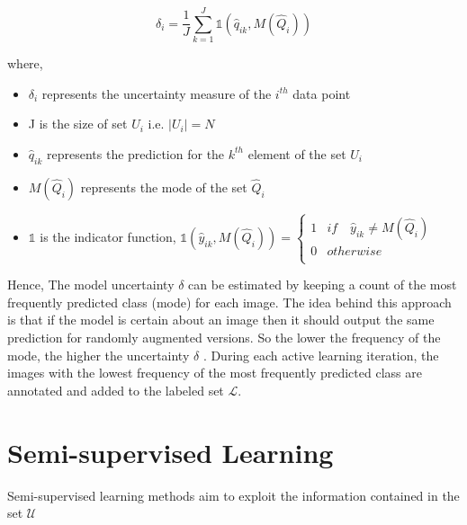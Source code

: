 \begin{equation}
    \label{equation:augmentation_based_sampling}
    \delta_{i} = \frac{1}{J} \sum_{k=1}^{J} \mathbb{1}(\hat{q}_{ik}, M(\hat{Q}_i))
\end{equation}

where,
\begin{itemize}[label={}]
  \setlength\itemsep{0em}
  \item $\delta_{i}$ represents the uncertainty measure of the $i^{th}$ data point
  \item J is the size of set $U_i$ i.e. $|U_i| = N$
  \item $\hat{q}_{ik}$ represents the prediction for the $k^{th}$ element of the set $U_i$
  \item $M(\hat{Q}_i)$ represents the mode of the set $\hat{Q}_i$
  \item $\mathbb{1}$ is the indicator function, $\mathbb{1}(\hat{y}_{ik}, M(\hat{Q}_i)) = \begin{cases} 
      1 & if \quad \hat{y}_{ik} \neq M(\hat{Q}_i) \\
      0 & otherwise \\
   \end{cases}$
\end{itemize}

Hence, The model uncertainty $\delta$ can be estimated by keeping a count of the most frequently predicted class (mode) for each image. The idea behind this approach is that if the model is certain about an image then it should output the same prediction for randomly augmented versions. So the lower the frequency of the mode, the higher the uncertainty $\delta$ \cite{sadafi2019}. During each active learning iteration, the images with  the lowest frequency of the most frequently predicted class are annotated and added to the labeled set $\mathcal{L}$.

\section{Semi-supervised Learning}\label{section:semi_supervised}
Semi-supervised learning methods aim to exploit the information contained in the set $\mathcal{U}$
